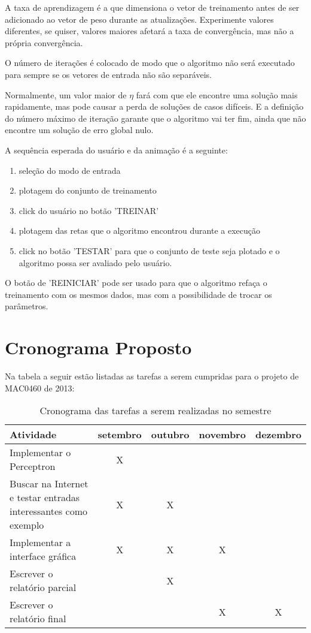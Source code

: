 \documentclass[brazil, a4paper]{article}
\begin{document}
A taxa de aprendizagem é a que dimensiona o vetor de treinamento antes de ser adicionado ao vetor de peso durante as atualizações. Experimente valores diferentes, se quiser, valores maiores afetará a taxa de convergência, mas não a própria convergência. 

O número de iterações é colocado de modo que o algoritmo não será executado para sempre se os vetores de entrada não são separáveis. 

Normalmente, um valor maior de $\eta$ fará com que ele encontre uma solução mais rapidamente, mas pode causar a perda de soluções de casos difíceis. E a definição do número máximo de iteração garante que o algoritmo vai ter fim, ainda que não encontre um solução de erro global nulo.

A sequência esperada do usuário e da animação é a seguinte:
\begin{enumerate}
\item seleção do modo de entrada
\item plotagem do conjunto de treinamento 
\item click do usuário no botão 'TREINAR'
\item plotagem das retas que o algoritmo encontrou durante a execução 
\item click no botão 'TESTAR' para que o conjunto de teste seja plotado e o algoritmo possa ser avaliado pelo usuário.
\end{enumerate}
O botão de 'REINICIAR' pode ser usado para que o algoritmo refaça o treinamento com os mesmos dados, mas com a possibilidade de trocar os parâmetros.

\section{Cronograma Proposto}
Na tabela a seguir estão listadas as tarefas a serem cumpridas para o projeto
de MAC0460 de 2013:

\begin{table}[h]
    \begin{tabular}{|p{5cm}|c|c|c|c|}
    \hline
    Atividade                                                       & setembro & outubro & novembro & dezembro \\ \hline
    Implementar o Perceptron                                        & X        & ~       & ~        & ~        \\
    Buscar na Internet e testar entradas interessantes como exemplo & X        & X       & ~        & ~        \\
    Implementar a interface gráfica                                 & X        & X       & X        & ~        \\
    Escrever o relatório parcial                                    & ~        & X       & ~        & ~        \\ 
    Escrever o relatório final                                      & ~        & ~       & X        & X        \\ \hline
    \end{tabular}
    \caption{Cronograma das tarefas a serem realizadas no semestre}
\end{table}
\end{document}
